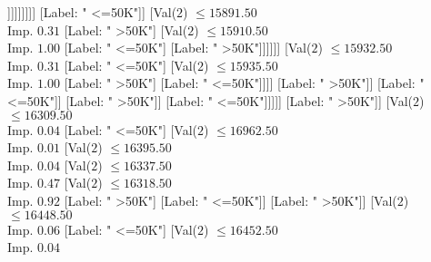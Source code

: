 \documentclass[margin=10pt]{standalone}
\begin{document}
\begin{forest}
																																								[Val($2$) $ \leq 15649.50$ \\ Imp. $0.20$
																																									[Label: " >50K"]
																																									[Val($2$) $ \leq 15676.50$ \\ Imp. $0.32$
																																										[Label: " <=50K"]
																																										[Val($2$) $ \leq 15708.50$ \\ Imp. $0.31$
																																											[Label: " >50K"]
																																											[Label: " <=50K"]]]]]]]]]
																																			[Label: " <=50K"]]
																																		[Val($2$) $ \leq 15891.50$ \\ Imp. $0.31$
																																			[Label: " >50K"]
																																			[Val($2$) $ \leq 15910.50$ \\ Imp. $1.00$
																																				[Label: " <=50K"]
																																				[Label: " >50K"]]]]]]
																															[Val($2$) $ \leq 15932.50$ \\ Imp. $0.31$
																																[Label: " <=50K"]
																																[Val($2$) $ \leq 15935.50$ \\ Imp. $1.00$
																																	[Label: " >50K"]
																																	[Label: " <=50K"]]]]
																														[Label: " >50K"]]
																													[Label: " <=50K"]]
																												[Label: " >50K"]]
																											[Label: " <=50K"]]]]]
																							[Label: " >50K"]]
																						[Val($2$) $ \leq 16309.50$ \\ Imp. $0.04$
																							[Label: " <=50K"]
																							[Val($2$) $ \leq 16962.50$ \\ Imp. $0.01$
																								[Val($2$) $ \leq 16395.50$ \\ Imp. $0.04$
																									[Val($2$) $ \leq 16337.50$ \\ Imp. $0.47$
																										[Val($2$) $ \leq 16318.50$ \\ Imp. $0.92$
																											[Label: " >50K"]
																											[Label: " <=50K"]]
																										[Label: " >50K"]]
																									[Val($2$) $ \leq 16448.50$ \\ Imp. $0.06$
																										[Label: " <=50K"]
																										[Val($2$) $ \leq 16452.50$ \\ Imp. $0.04$

\end{forest}
\end{document}
